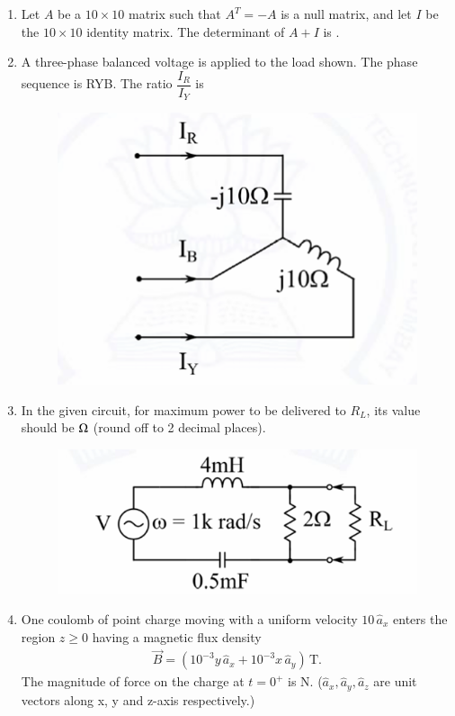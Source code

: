 \documentclass[journal,12pt,onecolumn]{IEEEtran}
\theoremstyle{remark}
\begin{document}
\begin{flushleft}
\begin{enumerate}
\item Let $A$ be a $10 \times 10$ matrix such that $A^T = -A$ is a null matrix, 
and let $I$ be the $10 \times 10$ identity matrix.  
The determinant of $A + I$ is  .


\item A three-phase balanced voltage is applied to the load shown. 
The phase sequence is RYB. The ratio $\dfrac{I_R}{I_Y}$ is

\begin{figure}[H]
    \centering
    \includegraphics[width=0.5\columnwidth]{figs/49.png}
    \caption{}
    \label{fig:placeholder}
\end{figure}


\item In the given circuit, for maximum power to be delivered to $R_L$, its value should be  $\ohm$ (round off to 2 decimal places).

\begin{figure}[H]
    \centering
    \includegraphics[width=0.5\columnwidth]{50.png}
    \caption{}
    \label{fig:placeholder}
\end{figure}




\item One coulomb of point charge moving with a uniform velocity $10 \, \hat{a}_x$ 
enters the region $z \geq 0$ having a magnetic flux density 
\begin{align*}
    \vec{B} = (10^{-3}y \, \hat{a}_x + 10^{-3}x \, \hat{a}_y) \, \text{T}.
\end{align*}
The magnitude of force on the charge at $t = 0^+$ is  N.  
($\hat{a}_x, \hat{a}_y, \hat{a}_z$ are unit vectors along x, y and z-axis respectively.)


\end{enumerate}
\end{flushleft}
\end{document}
